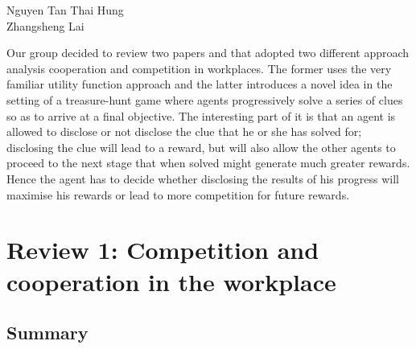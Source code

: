 \documentclass[a4paper,10pt]{article}
\theoremstyle{definition}
\begin{document}
\begin{flushright}
Nguyen Tan Thai Hung\\
Zhangsheng Lai\\
\end{flushright}
Our group decided to review two papers \cite{Drago1991} and \cite{Banerjee2014} that adopted two different approach analysis cooperation and competition in workplaces. The former uses the very familiar utility function approach and the latter introduces a novel idea in the setting of a treasure-hunt game where agents progressively solve a series of clues so as to arrive at a final objective. The interesting part of it is that an agent is allowed to disclose or not disclose the clue that he or she has solved for; disclosing the clue will lead to a reward, but will also allow the other agents to proceed to the next stage that when solved might generate much greater rewards. Hence the agent has to decide whether disclosing the results of his progress will maximise his rewards or lead to more competition for future rewards.


\section{Review 1: Competition and cooperation in the
workplace}
\subsection*{Summary}
\end{document}
